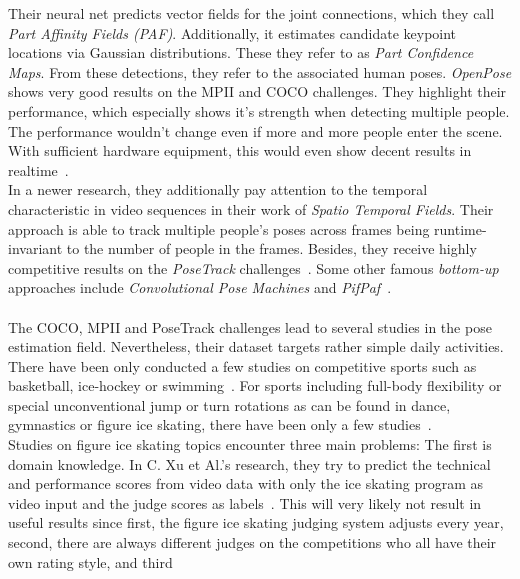     Their neural net predicts vector fields for the joint connections, which they call \textit{Part Affinity Fields (PAF)}.
    Additionally, it estimates candidate keypoint locations via Gaussian distributions.
    These they refer to as \textit{Part Confidence Maps}.
    From these detections, they refer to the associated human poses.
    \textit{OpenPose} shows very good results on the MPII and COCO challenges.
    They highlight their performance, which especially shows it's strength when detecting multiple people.
    The performance wouldn't change even if more and more people enter the scene.
    With sufficient hardware equipment, this would even show decent results in realtime~\cite{openpose}.\\
    In a newer research, they additionally pay attention to the temporal characteristic in video sequences in
    their work of \textit{Spatio Temporal Fields}.
    Their approach is able to track multiple people's poses across frames being runtime-invariant to the number
    of people in the frames.
    Besides, they receive highly competitive results on the \textit{PoseTrack} challenges~\cite{staf}.
    Some other famous \textit{bottom-up} approaches include \textit{Convolutional Pose Machines} and
    \textit{PifPaf}~\cite{convpose, pifpaf}.
\\\mbox{}\\
    The COCO, MPII and PoseTrack challenges lead to several studies in the pose estimation field.
    Nevertheless, their dataset targets rather simple daily activities.
    There have been only conducted a few studies on competitive sports such as basketball, ice-hockey or
    swimming~\cite{synergetic, posehockey, swimm}.
    For sports including full-body flexibility or special unconventional jump or turn rotations as can be found
    in dance, gymnastics or figure ice skating,
    there have been only a few studies~\cite{dance, figureskatingsimulation, scorefigureskating, fsd10}.\\
    Studies on figure ice skating topics encounter three main problems:
    The first is domain knowledge.
    In C. {Xu} et Al.'s research, they try to predict the technical and performance scores from video data with
    only the
    ice skating program as video input and the judge scores as labels~\cite{scorefigureskating}.
    This will very likely not result in useful results since first, the figure ice skating judging system adjusts
    every year,
    second, there are always different judges on the competitions who all have their own rating style, and third
